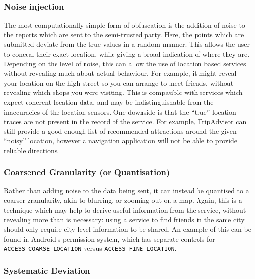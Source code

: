 \documentclass{IOS-Book-Article}     %
\newcommand{\tbox}[3][red]{{
\color{#1}\noindent{
   \fbox{\scriptsize{ {\bf #2} \textsl{#3}}}
   \vspace{2pt}
}
}}
\newcommand{\todo}[1]{\tbox{TODO:}{#1}}
\begin{document}
\subsubsection{Noise injection}

The most computationally simple form of obfuscation is the addition of noise to
the reports which are sent to the semi-trusted party. Here, the points which are
submitted deviate from the true values in a random manner. This allows the user
to conceal their exact location, while giving a broad indication of where they
are. Depending on the level of noise, this can allow the use of location
based services without revealing much about actual behaviour. For example, it
might reveal your location on the high street so you can arrange to meet
friends, without revealing which shops you were visiting. This is compatible
with services which expect coherent location data, and may be indistinguishable
from the inaccuracies of the location sensors. One downside is that the ``true''
location traces are not present in the record of the service.
For example, TripAdvisor can still provide a good enough list of recommended 
attractions around the given ``noisy'' location, however a navigation 
application will not be able to provide reliable directions.

\subsubsection{Coarsened Granularity (or Quantisation)}

Rather than adding noise to the data being sent, it can instead be quantised to
a coarser granularity, akin to blurring, or zooming out on a map. Again, this is
a technique which may help to derive useful information from the service,
without revealing more than is necessary: using a service to find friends in the
same city should only require city level information to be shared. An example of
this can be found in Android's permission system, which has separate controls
for \verb|ACCESS_COARSE_LOCATION| versus \verb|ACCESS_FINE_LOCATION|.

\subsubsection{Systematic Deviation}
\end{document}
